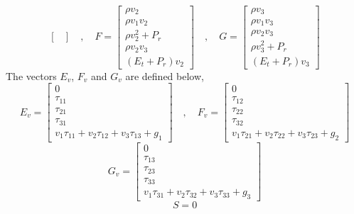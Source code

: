 \documentclass[a4paper, 12pt]{report}
\begin{document}
\begin{center}
$$\begin{bmatrix}
\end{bmatrix}\quad,\quad F = \begin{bmatrix}
\rho v_{2} \\ \rho v_{1}v_{2} \\ \rho v_{2}^{2} + P_{r} \\ \rho v_{2}v_{3} \\ (E_{t}+P_{r})v_{2}
\end{bmatrix}\quad,\quad G = \begin{bmatrix}
\rho v_{3} \\ \rho v_{1}v_{3} \\ \rho v_{2}v_{3} \\ \rho v_{3}^{2} + P_{r} \\ (E_{t} + P_{r})v_{3}
\end{bmatrix}$$
The vectors $E_{v}$, $F_{v}$ and $G_{v}$ are defined below,
$$E_{v} = \begin{bmatrix}
0 \\ \tau_{11} \\ \tau_{21} \\ \tau_{31} \\ 
v_{1}\tau_{11} + v_{2}\tau_{12} + v_{3}\tau_{13} + g_{1}
\end{bmatrix} \quad,\quad F_{v} = \begin{bmatrix}
0 \\ \tau_{12} \\ \tau_{22} \\ \tau_{32} \\
v_{1}\tau_{21} + v_{2}\tau_{22} + v_{3}\tau_{23} + g_{2}
\end{bmatrix}$$
$$G_{v} = \begin{bmatrix}
0 \\ \tau_{13} \\ \tau_{23} \\ \tau_{33} \\
v_{1}\tau_{31} + v_{2}\tau_{32} + v_{3}\tau_{33} + g_{3}
\end{bmatrix}$$
$$S = 0$$

\subsection{}
\begin{comment}
\end{comment}

\end{center}
\end{document}

